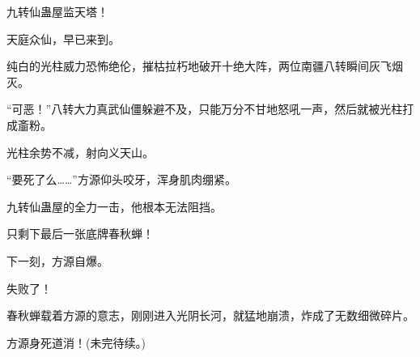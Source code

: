 \begin{this_body}
九转仙蛊屋监天塔！

天庭众仙，早已来到。

纯白的光柱威力恐怖绝伦，摧枯拉朽地破开十绝大阵，两位南疆八转瞬间灰飞烟灭。

“可恶！”八转大力真武仙僵躲避不及，只能万分不甘地怒吼一声，然后就被光柱打成齑粉。

光柱余势不减，射向义天山。

“要死了么……”方源仰头咬牙，浑身肌肉绷紧。

九转仙蛊屋的全力一击，他根本无法阻挡。

只剩下最后一张底牌春秋蝉！

下一刻，方源自爆。

失败了！

春秋蝉载着方源的意志，刚刚进入光阴长河，就猛地崩溃，炸成了无数细微碎片。

方源身死道消！(未完待续。)

\end{this_body}

